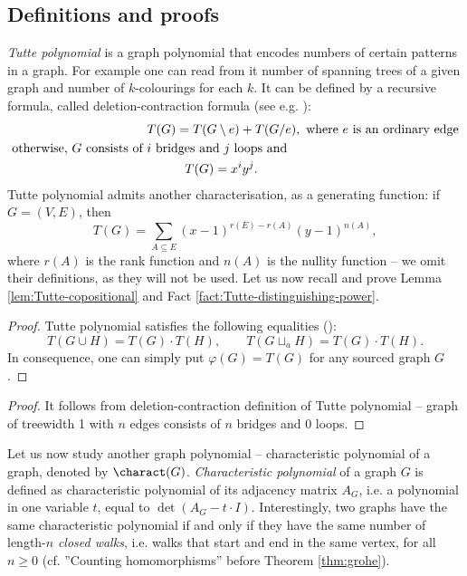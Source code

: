 \subsection{Definitions and proofs}
\emph{Tutte polynomial} is a graph polynomial that encodes numbers of certain patterns in a graph. For example one can read from it number of spanning trees of a given graph and number of $k$-colourings for each $k$. It can be defined by a recursive formula, called deletion-contraction formula (see e.g. \cite{Ellis-Monaghan2011}):
\begin{subequations}
\renewcommand{\theequation}{\theparentequation.\arabic{equation}}
\begin{align}
\indent\indent &T(G) = T(G\setminus e) + T(G/e), \text{ where } e \text{ is an ordinary edge}
\\
\text{otherwise, $G$ consists of } & \text{$i$ bridges and $j$ loops and} \nonumber
\\
&\indent\indent T(G) = x^iy^j. \label{eq:Tutte-definition2}
\end{align}
\end{subequations}
Tutte polynomial admits another characterisation, as a generating function: if $G = (V,E)$, then $$T(G) = \sum_{A\subseteq E} (x-1)^{r(E) - r(A)} (y-1)^{n(A)},$$ where $r(A)$ is the rank function and $n(A)$ is the nullity function -- we omit their definitions, as they will not be used.
Let us now recall and prove Lemma \ref{lem:Tutte-copositional} and Fact \ref{fact:Tutte-distinguishing-power}.
\lemmaTuttecompo*
\begin{proof}
Tutte polynomial satisfies the following equalities (\cite[Proposition 1]{Ellis-Monaghan2011}):
$$
T(G\cup H) = T(G) \cdot T(H), \qquad T(G\sqcup_a H) = T(G) \cdot T(H).
$$
In consequence, one can simply put $\varphi(G) = T(G)$ for any sourced graph $G$. %
\end{proof}
\factTuttedistinguishing*
\begin{proof}
It follows from deletion-contraction definition of Tutte polynomial -- graph of treewidth 1 with $n$ edges consists of $n$ bridges and 0 loops.
\end{proof}
Let us now study another graph polynomial -- characteristic polynomial of a graph, denoted by $\charact(G)$. \emph{Characteristic polynomial} of a graph $G$ is defined as characteristic polynomial of its adjacency matrix $A_G$, i.e. a polynomial in one variable $t$, equal to $\det(A_G - t \cdot I)$. Interestingly, two graphs have the same characteristic polynomial if and only if they have the same number of length-$n$ \emph{closed walks}, i.e. walks that start and end in the same vertex, for all $n \geq 0$ (cf. ''Counting homomorphisms'' before Theorem \ref{thm:grohe}). 

